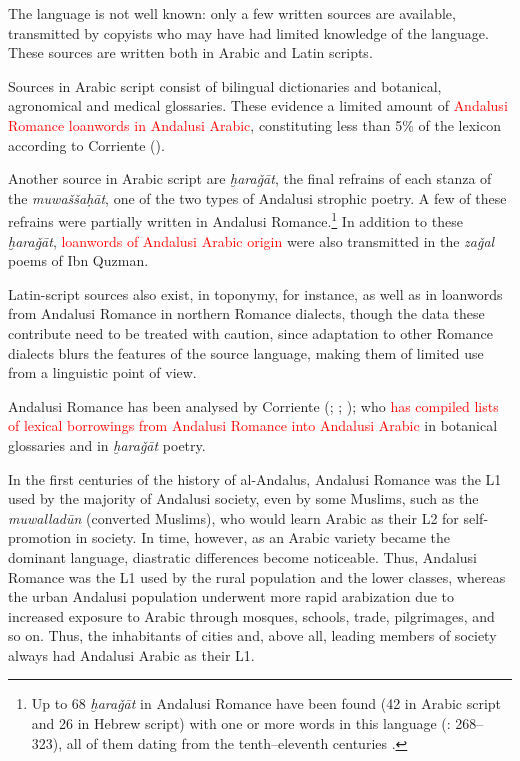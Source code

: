 \documentclass[output=paper,modfonts,nonflat]{langsci/langscibook}
\begin{document}
The language is not well known: only a few written sources are available, transmitted by copyists who may have had limited knowledge of the language. These sources are written both in Arabic and Latin scripts. 

Sources in Arabic script consist of bilingual dictionaries and botanical, agronomical and medical glossaries. These evidence a limited amount of \textcolor{red}{Andalusi Romance loanwords in Andalusi Arabic}, constituting less than 5\% of the lexicon according to Corriente (\citeyear[142]{Corriente1992book}).

Another source in Arabic script are \textit{ḫaraǧāt}, the final refrains of each stanza of the \textit{muwaššaḥāt}, one of the two types of Andalusi strophic poetry. A few of these refrains were partially written in Andalusi Romance.\footnote{Up to 68 \textit{ḫaraǧāt} in Andalusi Romance have been found (42 in Arabic script and 26 in Hebrew script) with one or more words in this language (\citealt{Corriente1997poetry}: 268–323), all of them dating from the tenth--eleventh centuries \citep[343]{Corriente1997poetry}.} In addition to these \textit{ḫaraǧāt}, \textcolor{red}{loanwords of Andalusi Arabic origin} were also transmitted in the \textit{zaǧal} poems of Ibn Quzman. 

Latin-script sources also exist, in toponymy, for instance, as well as in loanwords from Andalusi Romance in northern Romance dialects, though the data these contribute need to be treated with caution, since adaptation to other Romance dialects blurs the features of the source language, making them of limited use from a linguistic point of view. 

Andalusi Romance has been analysed by Corriente (\citeyear{Corriente1995}; \citeyear{Corriente2000}; \citeyear{Corriente2012}); who \textcolor{red}{has compiled lists of lexical borrowings from Andalusi Romance into Andalusi Arabic} in botanical glossaries and in \textit{ḫaraǧāt} poetry.  

In the first centuries of the history of al-Andalus, Andalusi Romance was the L1 used by the majority of Andalusi society, even by some Muslims, such as the \textit{muwalladūn} (converted Muslims), who would learn Arabic as their L2 for self-promotion in society. In time, however, as an Arabic variety became the dominant language, diastratic differences become noticeable. Thus, Andalusi Romance was the L1 used by the rural population and the lower classes, whereas the urban Andalusi population underwent more rapid arabization due to increased exposure to Arabic through mosques, schools, trade, pilgrimages, and so on. Thus, the inhabitants of cities and, above all, leading members of society always had Andalusi Arabic as their L1. 
\end{document}
